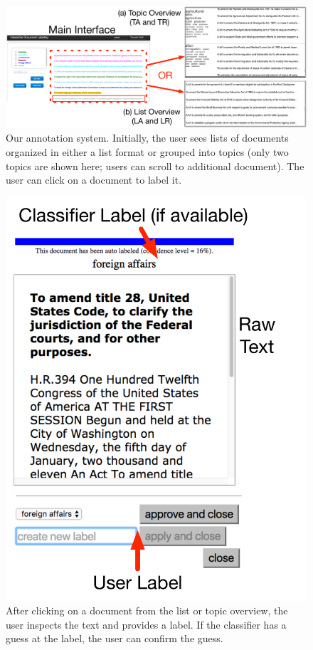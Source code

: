 
\begin{figure}[t!]

  \begin{center}
  \includegraphics[width=\textwidth]{2016_acl_doclabel/figures/ui_docview}
  \end{center}

	\caption{Our annotation system.  Initially, the user sees lists of
          documents organized in either a list format or grouped into
          topics (only two topics are shown here; users can scroll to
          additional document).  The user can click on a document to
          label it.}
\label{fig:UI-overview}
\end{figure}

\begin{figure}[t!]

  \begin{center}
  \includegraphics[width=.7\linewidth]{2016_acl_doclabel/figures/UI_labeling}
  \end{center}

	\caption{After clicking on a document from the list or
          topic overview, the user inspects the text and provides
          a label.  If the classifier has a guess at the
          label, the user can confirm the guess.}
\label{fig:UI-label}
\end{figure}

